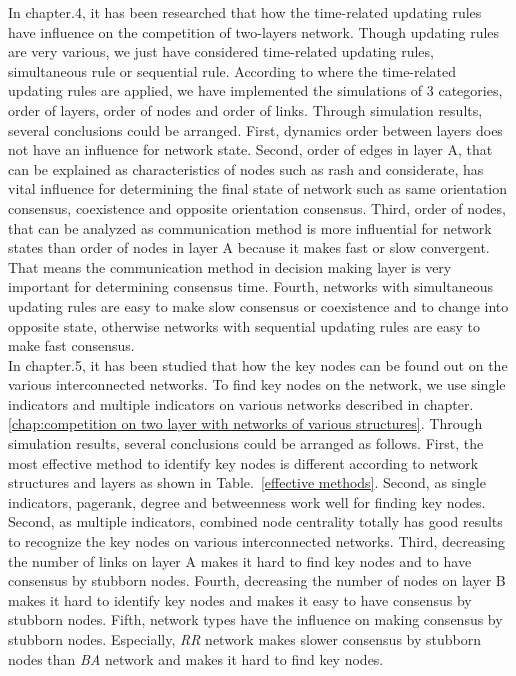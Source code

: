 In chapter.4, it has been researched that how the time-related updating rules have influence on the competition of two-layers network. Though updating rules are very various, we just have considered time-related updating rules, simultaneous rule or sequential rule. According to where the time-related updating rules are applied, we have implemented the simulations of 3 categories, order of layers, order of nodes and order of links. Through simulation results, several conclusions could be arranged. First, dynamics order between layers does not have an influence for network state. Second, order of edges in layer A, that can be explained as characteristics of nodes such as rash and considerate, has vital influence for determining the final state of network such as same orientation consensus, coexistence and opposite orientation consensus. Third, order of nodes, that can be analyzed as communication method is more influential for network states than order of nodes in layer A because it makes fast or slow convergent. That means the communication method in decision making layer is very important for determining consensus time. Fourth, networks with simultaneous updating rules are easy to make slow consensus or coexistence and to change into opposite state, otherwise networks with sequential updating rules are easy to make fast consensus. \\

In chapter.5, it has been studied that how the key nodes can be found out on the various interconnected networks. To find key nodes on the network, we use single indicators and multiple indicators on various networks described in chapter.\ref{chap:competition on two layer with networks of various structures}. Through simulation results, several conclusions could be arranged as follows.
First, the most effective method to identify key nodes is different according to network structures and layers as shown in Table.~\ref{effective methods}. Second, as single indicators, pagerank, degree and betweenness work well for finding key nodes. Second, as multiple indicators, combined node centrality totally has good results to recognize the key nodes on various interconnected networks. Third, decreasing the number of links on layer A makes it hard to find key nodes and to have consensus by stubborn nodes.  Fourth, decreasing the number of nodes on layer B makes it hard to identify key nodes and makes it easy to have consensus by stubborn nodes. Fifth, network types have the influence on making consensus by stubborn nodes. Especially, \textit{RR} network makes slower consensus by stubborn nodes than \textit{BA} network and makes it hard to find key nodes. 
  
